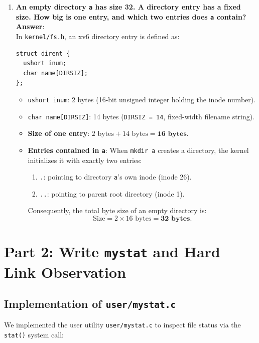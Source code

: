 \documentclass[12pt,a4paper]{article}
\begin{document}
\begin{enumerate}
    \item \textbf{An empty directory \texttt{a} has size 32. A directory entry has a fixed size. How big is one entry, and which two entries does \texttt{a} contain?} \\
    \textbf{Answer}: \\
    In \texttt{kernel/fs.h}, an xv6 directory entry is defined as:
    \begin{lstlisting}[style=cstyle]
struct dirent {
  ushort inum;
  char name[DIRSIZ];
};
    \end{lstlisting}
    \begin{itemize}
        \item \texttt{ushort inum}: 2 bytes (16-bit unsigned integer holding the inode number).
        \item \texttt{char name[DIRSIZ]}: 14 bytes (\texttt{DIRSIZ = 14}, fixed-width filename string).
        \item \textbf{Size of one entry}: $2\text{ bytes} + 14\text{ bytes} = \mathbf{16\text{ bytes}}$.
        \item \textbf{Entries contained in \texttt{a}}: When \texttt{mkdir a} creates a directory, the kernel initializes it with exactly two entries:
        \begin{enumerate}
            \item \texttt{.}: pointing to directory \texttt{a}'s own inode (inode 26).
            \item \texttt{..}: pointing to parent root directory (inode 1).
        \end{enumerate}
        Consequently, the total byte size of an empty directory is:
        \[
        \text{Size} = 2 \times 16\text{ bytes} = \mathbf{32\text{ bytes}}.
        \]
    \end{itemize}
\end{enumerate}

\newpage

\section{Part 2: Write \texttt{mystat} and Hard Link Observation}

\subsection{Implementation of \texttt{user/mystat.c}}
We implemented the user utility \texttt{user/mystat.c} to inspect file status via the \texttt{stat()} system call:
\end{document}

